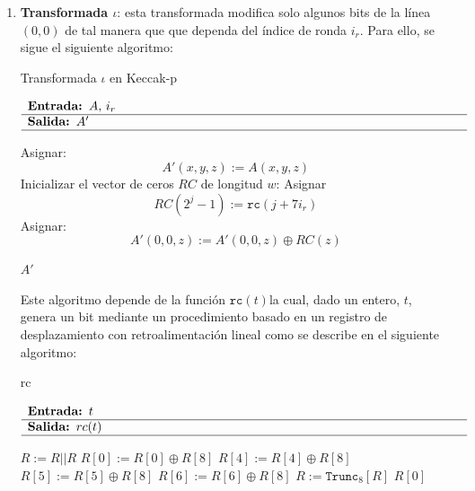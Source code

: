 \begin{enumerate}
	\item \textbf{Transformada \(\iota\)}: esta transformada modifica solo algunos bits de la línea \((0,0)\) de tal manera que que dependa del índice de ronda \(i_r\). Para ello, se sigue el siguiente algoritmo:
	\begin{algorithm}[H]
		\caption{Transformada \(\iota\) en Keccak-p}
		$\begin{array}{p{\textwidth}}
			\textbf{Entrada: }\(A\), \(i_r\) \\ 
			\hline
			\textbf{Salida: }\(A'\) \\ 
			\hline
		\end{array}$
		\begin{algorithmic}[1]
			\State Asignar:
			\begin{equation}
				A'(x,y,z):=A(x,y,z)
			\end{equation}
			\State Inicializar el vector de ceros \(RC\) de longitud \(w\):
			 
			\State Asignar
			\begin{equation}
				RC(2^j-1):=\texttt{rc}(j+7i_r)
			\end{equation}
			\EndFor
			\State Asignar:
			\begin{equation}
				A'(0,0,z):=A'(0,0,z)\oplus RC(z)
			\end{equation} 
			
			\State \Return \(A'\)
		\end{algorithmic}
	\end{algorithm}
	 
	Este algoritmo depende de la función \(\texttt{rc}(t)\)la cual, dado un entero, $t$, genera un bit mediante un procedimiento basado en un registro de desplazamiento con retroalimentación lineal como se describe en el siguiente algoritmo:
	\begin{algorithm}[H]
		\caption{rc}
		$\begin{array}{p{\textwidth}}
			\textbf{Entrada: }\(t\)\\ 
			\hline
			\textbf{Salida: }\(rc(t)\) \\ 
			\hline
		\end{array}$
		\begin{algorithmic}[1]
			\State {}
			\EndIf
			\State \(R:=R||R\)
			\State \(R[0]:=R[0]\oplus R[8]\)
			\State \(R[4]:=R[4]\oplus R[8]\)
			\State \(R[5]:=R[5]\oplus R[8]\)
			\State \(R[6]:=R[6]\oplus R[8]\)
			\State \(R:=\texttt{Trunc}_8[R]\) 
			\EndFor
			\State \Return \(R[0]\)
		\end{algorithmic}
	\end{algorithm}
\end{enumerate}
\newpage

